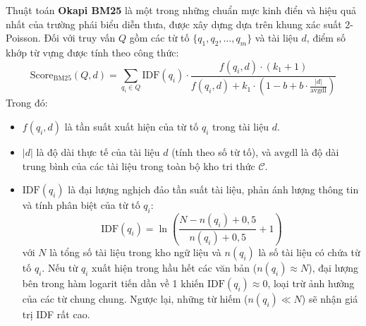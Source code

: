Thuật toán \textbf{Okapi BM25} \cite{bm25_robertson_2009} là một trong những chuẩn mực kinh điển và hiệu quả nhất của trường phái biểu diễn thưa, được xây dựng dựa trên khung xác suất 2-Poisson. Đối với truy vấn $Q$ gồm các từ tố $\{q_1, q_2, \dots, q_m\}$ và tài liệu $d$, điểm số khớp từ vựng được tính theo công thức:
\begin{equation}
  \text{Score}_{\text{BM25}}(Q, d) = \sum_{q_i \in Q} \text{IDF}(q_i) \cdot \frac{f(q_i, d) \cdot (k_1 + 1)}{f(q_i, d) + k_1 \cdot \left(1 - b + b \cdot \frac{|d|}{\text{avgdl}}\right)}
  \label{eq:bm25_formula}
\end{equation}
Trong đó:
\begin{itemize}[nosep]
  \item $f(q_i, d)$ là tần suất xuất hiện của từ tố $q_i$ trong tài liệu $d$.
  \item $|d|$ là độ dài thực tế của tài liệu $d$ (tính theo số từ tố), và $\text{avgdl}$ là độ dài trung bình của các tài liệu trong toàn bộ kho tri thức $\mathcal{C}$.
  \item $\text{IDF}(q_i)$ là đại lượng nghịch đảo tần suất tài liệu, phản ánh lượng thông tin và tính phân biệt của từ tố $q_i$:
  \begin{equation}
    \text{IDF}(q_i) = \ln \left( \frac{N - n(q_i) + 0{,}5}{n(q_i) + 0{,}5} + 1 \right)
    \label{eq:bm25_idf}
  \end{equation}
  với $N$ là tổng số tài liệu trong kho ngữ liệu và $n(q_i)$ là số tài liệu có chứa từ tố $q_i$. Nếu từ $q_i$ xuất hiện trong hầu hết các văn bản ($n(q_i) \approx N$), đại lượng bên trong hàm logarit tiến dần về 1 khiến $\text{IDF}(q_i) \approx 0$, loại trừ ảnh hưởng của các từ chung chung. Ngược lại, những từ hiếm ($n(q_i) \ll N$) sẽ nhận giá trị IDF rất cao.
\end{itemize}

